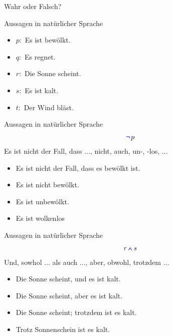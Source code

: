 \begin{frame}[t]{Wahr oder Falsch?}
	\TrueQuestion{$\alA \boder \alB \equiv \alB \boder \alA$}
\end{frame}




\begin{frame}{Aussagen in natürlicher Sprache}
	\begin{Beispiel}
		\begin{itemize}
			\item $p:$ Es ist bewölkt.
			\item $q:$ Es regnet.
			\item $r:$ Die Sonne scheint.
			\item $s:$ Es ist kalt.
			\item $t:$ Der Wind bläst.
		\end{itemize}

	\end{Beispiel}
\end{frame}

\begin{frame}{Aussagen in natürlicher Sprache}
	\begin{align}
		\alnot p
	\end{align}
	Es ist nicht der Fall, dass $\dots$, nicht, auch, un-, -los, $\dots$
	\begin{Beispiel}
		\begin{itemize}
			\item Es ist nicht der Fall, dass es bewölkt ist.
			\item Es ist nicht bewölkt.
			\item Es ist unbewölkt.
			\item Es ist wolkenlos
		\end{itemize}
	\end{Beispiel}
\end{frame}

\begin{frame}{Aussagen in natürlicher Sprache}
	\begin{align}
		r \aland s
	\end{align}
	Und, sowhol $\dots$ als auch $\dots$, aber, obwohl, trotzdem $\dots$
	\begin{Beispiel}
		\begin{itemize}
			\item Die Sonne scheint, und es ist kalt.
			\item Die Sonne scheint, aber es ist kalt.
			\item Die Sonne scheint; trotzdem ist es kalt.
			\item Trotz Sonnenschein ist es kalt.
		\end{itemize}
	\end{Beispiel}
\end{frame}

